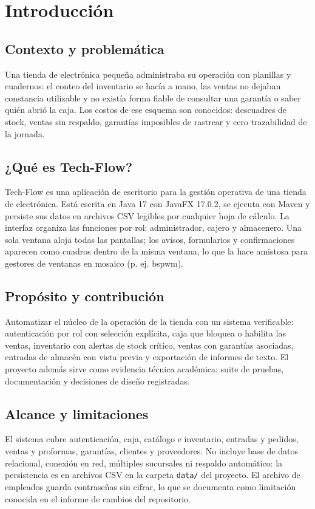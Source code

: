 \chapter{Introducción}

\section{Contexto y problemática}
Una tienda de electrónica pequeña administraba su operación con planillas y cuadernos: el conteo del inventario se hacía a mano, las ventas no dejaban constancia utilizable y no existía forma fiable de consultar una garantía o saber quién abrió la caja. Los costos de ese esquema son conocidos: descuadres de stock, ventas sin respaldo, garantías imposibles de rastrear y cero trazabilidad de la jornada.

\section{¿Qué es Tech-Flow?}
Tech-Flow es una aplicación de escritorio para la gestión operativa de una tienda de electrónica. Está escrita en Java 17 con JavaFX 17.0.2, se ejecuta con Maven y persiste sus datos en archivos CSV legibles por cualquier hoja de cálculo. La interfaz organiza las funciones por rol: administrador, cajero y almacenero. Una sola ventana aloja todas las pantallas; los avisos, formularios y confirmaciones aparecen como cuadros dentro de la misma ventana, lo que la hace amistosa para gestores de ventanas en mosaico (p. ej. bspwm).

\section{Propósito y contribución}
Automatizar el núcleo de la operación de la tienda con un sistema verificable: autenticación por rol con selección explícita, caja que bloquea o habilita las ventas, inventario con alertas de stock crítico, ventas con garantías asociadas, entradas de almacén con vista previa y exportación de informes de texto. El proyecto además sirve como evidencia técnica académica: suite de pruebas, documentación y decisiones de diseño registradas.

\section{Alcance y limitaciones}
El sistema cubre autenticación, caja, catálogo e inventario, entradas y pedidos, ventas y proformas, garantías, clientes y proveedores. No incluye base de datos relacional, conexión en red, múltiples sucursales ni respaldo automático: la persistencia es en archivos CSV en la carpeta \texttt{data/} del proyecto. El archivo de empleados guarda contraseñas sin cifrar, lo que se documenta como limitación conocida en el informe de cambios del repositorio.
